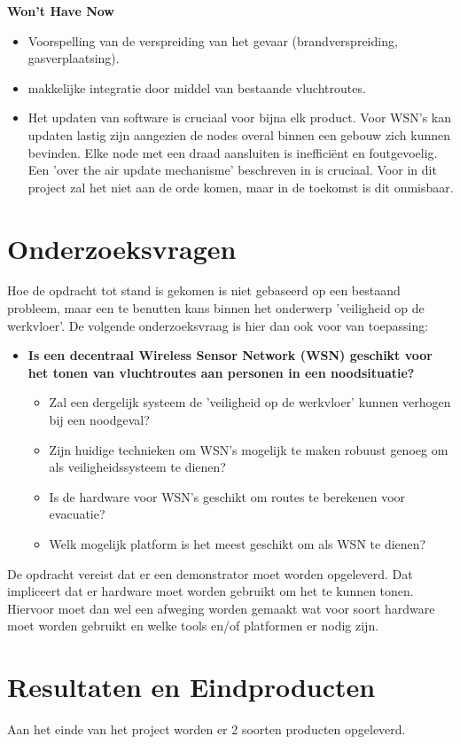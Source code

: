\documentclass{../local}
\begin{document}
\noindent\textbf{Won't Have Now}
\begin{itemize}
\item Voorspelling van de verspreiding van het gevaar (brandverspreiding, gasverplaatsing).
\item makkelijke integratie door middel van bestaande vluchtroutes.
\item Het updaten van software is cruciaal voor bijna elk product. Voor WSN's kan updaten lastig zijn aangezien de nodes overal binnen een gebouw zich kunnen bevinden. Elke node met een draad aansluiten is inefficiënt en foutgevoelig. Een 'over the air update mechanisme' beschreven in \cite{StatRUP} is cruciaal. Voor in dit project zal het niet aan de orde komen, maar in de toekomst is dit onmisbaar.
\end{itemize}
\section{Onderzoeksvragen}
Hoe de opdracht tot stand is gekomen is niet gebaseerd op een bestaand probleem, maar een te benutten kans binnen het onderwerp 'veiligheid op de werkvloer'. De volgende onderzoeksvraag is hier dan ook voor van toepassing:

\begin{itemize}
\item \textbf{Is een decentraal Wireless Sensor Network (WSN) geschikt voor het tonen van vluchtroutes aan personen in een noodsituatie?} 
\begin{itemize}
\item Zal een dergelijk systeem de 'veiligheid op de werkvloer' kunnen verhogen bij een noodgeval?
\item Zijn huidige technieken om WSN's mogelijk te maken robuust genoeg om als veiligheidssysteem te dienen?
\item Is de hardware voor WSN's geschikt om routes te berekenen voor evacuatie?
\item Welk mogelijk platform is het meest geschikt om als WSN te dienen?
\end{itemize}
\end{itemize}

De opdracht vereist dat er een demonstrator moet worden opgeleverd. Dat impliceert dat er hardware moet worden gebruikt om het te kunnen tonen. Hiervoor moet dan wel een afweging worden gemaakt wat voor soort hardware moet worden gebruikt en welke tools en/of platformen er nodig zijn.

\section{Resultaten en Eindproducten}
Aan het einde van het project worden er 2 soorten producten opgeleverd.
\end{document}
